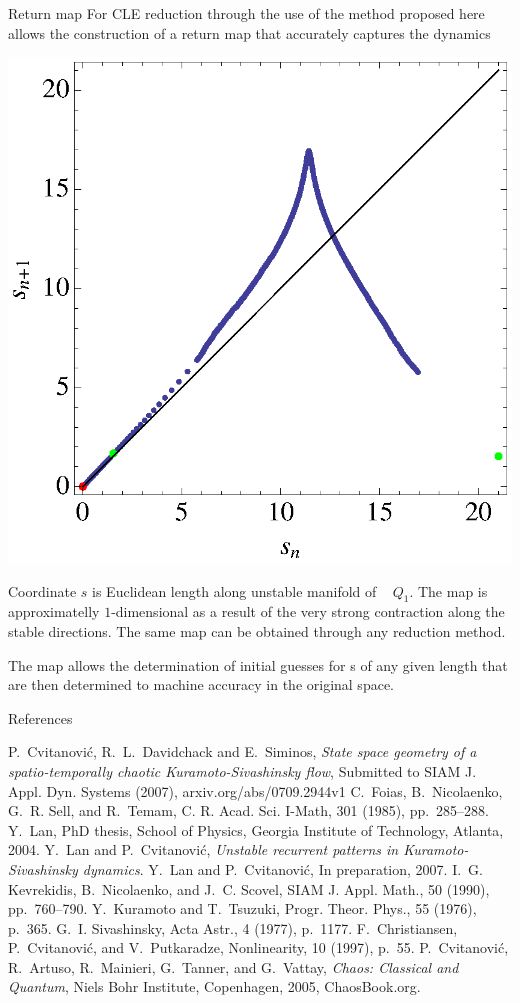 \documentclass{theo1poster}[2003/04/25]
\begin{document}
\begin{poster}{3}
\begin{sheet}{Return map}
 For CLE reduction through the use of the method proposed here allows the construction
 of a return map that accurately captures the dynamics
 \begin{center}
 	 	\includegraphics[width=.38\textwidth]{../../figs/CLEinvRM.eps}
 \end{center}
 Coordinate $s$ is Euclidean length along unstable manifold of \reqv~
 $Q_1$. The map is approximatelly $1$-dimensional as a result of the very strong 
 contraction along the stable directions. The same map can be obtained through
 any reduction method.

 The map allows the determination of initial guesses for \rpo s of any given
 length that are then determined to machine accuracy in the original space.

 
 
 

 
\end{sheet}



\begin{sheet}{References}
\begin{thebibliography}{99}
	{\sc P.~Cvitanovi\'c, R.~L.~Davidchack and E.~Siminos},
	\emph{State space geometry of a spatio-temporally chaotic Kuramoto-Sivashinsky flow}, Submitted to
	SIAM J. Appl. Dyn. Systems (2007), arxiv.org/abs/0709.2944v1
{\sc C.~Foias, B.~Nicolaenko, G.~R. Sell, and R.~Temam}, C. R. Acad. Sci. I-Math, 301
  (1985), pp.~285--288.
{\sc Y.~Lan}, PhD thesis, School of Physics, Georgia Institute of
  Technology, Atlanta, 2004.
{\sc Y.~Lan and P.~Cvitanovi\'{c}}, {\em Unstable recurrent patterns in
  {K}uramoto-{S}ivashinsky dynamics}.
{\sc Y.~Lan and P.~Cvitanovi\'{c}}, 
\newblock In preparation, 2007.
{\sc I.~G. Kevrekidis, B.~Nicolaenko, and J.~C. Scovel},  SIAM J. Appl. Math., 50 (1990), pp.~760--790.
{\sc Y.~Kuramoto and T.~Tsuzuki},  Progr. Theor.
  Phys., 55 (1976), p.~365.
{\sc G.~I. Sivashinsky}, Acta Astr., 4
  (1977), p.~1177.
{\sc F.~Christiansen, P.~Cvitanovi\'{c}, and V.~Putkaradze}, Nonlinearity,
  10 (1997), p.~55.
{\sc P.~Cvitanovi\'{c}, R.~Artuso, R.~Mainieri, G.~Tanner, and G.~Vattay}, {\em
  Chaos: Classical and Quantum}, Niels Bohr Institute, Copenhagen, 2005,
  ChaosBook.org.
\end{thebibliography}
\end{sheet}



\end{poster}
\end{document}
